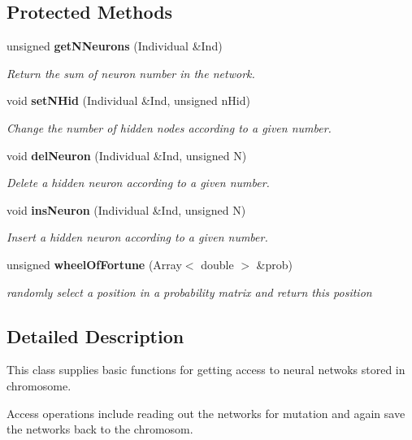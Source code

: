 \subsection*{Protected Methods}
\begin{CompactItemize}
\item 
unsigned {\bf get\-NNeurons} (Individual \&Ind)
\begin{CompactList}\small\item\em Return the sum of neuron number in the network.\item\end{CompactList}\item 
void {\bf set\-NHid} (Individual \&Ind, unsigned n\-Hid)
\begin{CompactList}\small\item\em Change the number of hidden nodes according to a given number.\item\end{CompactList}\item 
void {\bf del\-Neuron} (Individual \&Ind, unsigned N)
\begin{CompactList}\small\item\em Delete a hidden neuron according to a given number.\item\end{CompactList}\item 
void {\bf ins\-Neuron} (Individual \&Ind, unsigned N)
\begin{CompactList}\small\item\em Insert a hidden neuron according to a given number.\item\end{CompactList}\item 
unsigned {\bf wheel\-Of\-Fortune} (Array$<$ double $>$ \&prob)
\begin{CompactList}\small\item\em randomly select a position in a probability matrix and return this position\item\end{CompactList}\end{CompactItemize}


\subsection{Detailed Description}
This class supplies basic functions for getting access to neural netwoks stored in chromosome.

Access operations include reading out the networks for mutation and again save the networks back to the chromosom. 



